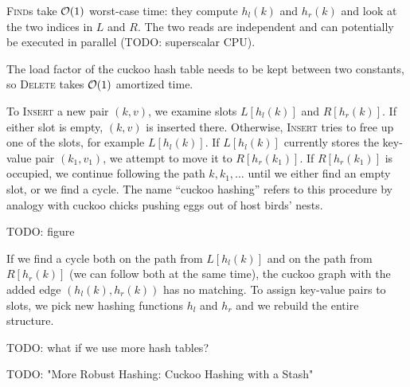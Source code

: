 \textsc{Find}s take $\mathcal{O}(1)$ worst-case time: they compute $h_l(k)$ and $h_r(k)$
and look at the two indices in $L$ and $R$. The two reads are independent and
can potentially be executed in parallel (TODO: superscalar CPU).

The load factor of the cuckoo hash table needs to be kept between two
constants, so \textsc{Delete} takes $\mathcal{O}(1)$ amortized time.

To \textsc{Insert} a new pair $(k,v)$, we examine slots $L[h_l(k)]$ and
$R[h_r(k)]$. If either slot is empty, $(k,v)$ is inserted there. Otherwise,
\textsc{Insert} tries to free up one of the slots, for example $L[h_l(k)]$.
If $L[h_l(k)]$ currently stores the key-value pair $(k_1,v_1)$, we attempt to
move it to $R[h_r(k_1)]$. If $R[h_r(k_1)]$ is occupied, we continue following
the path $k,k_1,\ldots$ until we either find an empty slot, or we find a cycle.
The name ``cuckoo hashing'' refers to this procedure by analogy with
cuckoo chicks pushing eggs out of host birds' nests.

TODO: figure

If we find a cycle both on the path from $L[h_l(k)]$ and on the path from
$R[h_r(k)]$ (we can follow both at the same time), the cuckoo graph with
the added edge $(h_l(k),h_r(k))$ has no matching. To assign key-value pairs
to slots, we pick new hashing functions $h_l$ and $h_r$ and we rebuild
the entire structure.

TODO: what if we use more hash tables?

TODO: "More Robust Hashing: Cuckoo Hashing with a Stash"
